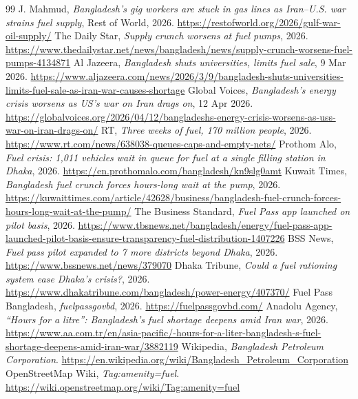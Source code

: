 \documentclass[11pt,a4paper]{article}
\begin{document}

\begin{thebibliography}{99}
 J. Mahmud, \emph{Bangladesh's gig workers are stuck in gas lines as Iran--U.S. war strains fuel supply}, Rest of World, 2026. \url{https://restofworld.org/2026/gulf-war-oil-supply/}
 The Daily Star, \emph{Supply crunch worsens at fuel pumps}, 2026. \url{https://www.thedailystar.net/news/bangladesh/news/supply-crunch-worsens-fuel-pumps-4134871}
 Al Jazeera, \emph{Bangladesh shuts universities, limits fuel sale}, 9 Mar 2026. \url{https://www.aljazeera.com/news/2026/3/9/bangladesh-shuts-universities-limits-fuel-sale-as-iran-war-causes-shortage}
 Global Voices, \emph{Bangladesh's energy crisis worsens as US's war on Iran drags on}, 12 Apr 2026. \url{https://globalvoices.org/2026/04/12/bangladeshs-energy-crisis-worsens-as-uss-war-on-iran-drags-on/}
 RT, \emph{Three weeks of fuel, 170 million people}, 2026. \url{https://www.rt.com/news/638038-queues-caps-and-empty-nets/}
 Prothom Alo, \emph{Fuel crisis: 1{,}011 vehicles wait in queue for fuel at a single filling station in Dhaka}, 2026. \url{https://en.prothomalo.com/bangladesh/kn9slg0amt}
 Kuwait Times, \emph{Bangladesh fuel crunch forces hours-long wait at the pump}, 2026. \url{https://kuwaittimes.com/article/42628/business/bangladesh-fuel-crunch-forces-hours-long-wait-at-the-pump/}
 The Business Standard, \emph{Fuel Pass app launched on pilot basis}, 2026. \url{https://www.tbsnews.net/bangladesh/energy/fuel-pass-app-launched-pilot-basis-ensure-transparency-fuel-distribution-1407226}
 BSS News, \emph{Fuel pass pilot expanded to 7 more districts beyond Dhaka}, 2026. \url{https://www.bssnews.net/news/379070}
 Dhaka Tribune, \emph{Could a fuel rationing system ease Dhaka's crisis?}, 2026. \url{https://www.dhakatribune.com/bangladesh/power-energy/407370/}
 Fuel Pass Bangladesh, \emph{fuelpassgovbd}, 2026. \url{https://fuelpassgovbd.com/}
 Anadolu Agency, \emph{``Hours for a litre'': Bangladesh's fuel shortage deepens amid Iran war}, 2026. \url{https://www.aa.com.tr/en/asia-pacific/-hours-for-a-liter-bangladesh-s-fuel-shortage-deepens-amid-iran-war/3882119}
 Wikipedia, \emph{Bangladesh Petroleum Corporation}. \url{https://en.wikipedia.org/wiki/Bangladesh_Petroleum_Corporation}
 OpenStreetMap Wiki, \emph{Tag:amenity=fuel}. \url{https://wiki.openstreetmap.org/wiki/Tag:amenity=fuel}

\end{thebibliography}
\end{document}
